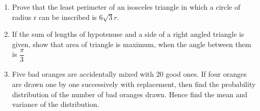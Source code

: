 \documentclass[12pt,-letter paper]{article}
\theoremstyle{remark}
\begin{document}
\begin{enumerate}
    \item Prove that the least perimeter of an isosceles triangle in which a circle of radius r can be inscribed is $6\sqrt{3}r$.
    
    \item If the sum of lengths of hypotenuse and a side of a right angled triangle is given, show that area of triangle is maximum, when the angle between them is $\dfrac{\pi}{3}$
    \item Five bad oranges are accidentally mixed with $20$ good ones. If four oranges are drawn one by one successively with replacement, then find the probability distribution of the number of bad oranges drawn. Hence find the mean and variance of the distribution.
\end{enumerate}
\end{document}
